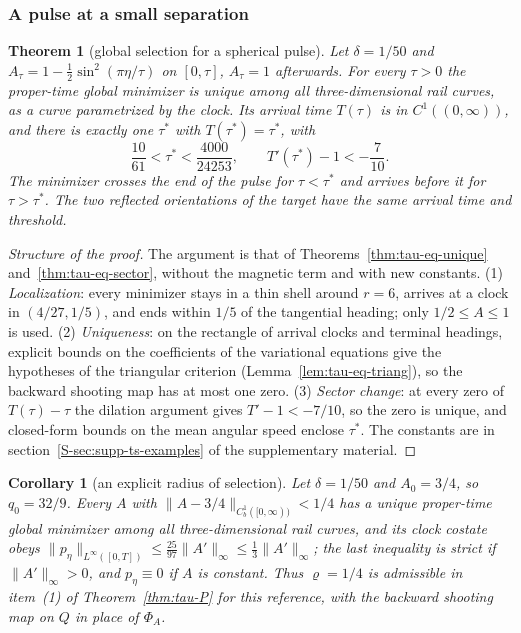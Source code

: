 \documentclass[aip,jmp,amsmath,amssymb,reprint]{revtex4-2}
\theoremstyle{plain}
\newtheorem{theorem}{Theorem}
\newtheorem{corollary}[proposition]{Corollary}
\theoremstyle{definition}
\begin{document}
\subsubsection*{A pulse at a small separation}
\begin{theorem}[global selection for a spherical pulse]\label{thm:tau-var-pulse}
Let $\delta=1/50$ and $A_\tau=1-\frac12\sin^2(\pi\eta/\tau)$ on $[0,\tau]$, $A_\tau=1$ afterwards. For every
$\tau>0$ the proper-time global minimizer is unique among all three-dimensional rail curves, as a curve
parametrized by the clock. Its arrival time $T(\tau)$ is in $C^1((0,\infty))$, and there is exactly one
$\tau^*$ with $T(\tau^*)=\tau^*$, with
\[
  \frac{10}{61}<\tau^*<\frac{4000}{24253},\qquad T'(\tau^*)-1<-\frac7{10}.
\]
The minimizer crosses the end of the pulse for $\tau<\tau^*$ and arrives before it for $\tau>\tau^*$. The two
reflected orientations of the target have the same arrival time and threshold.
\end{theorem}

\begin{proof}[Structure of the proof]
The argument is that of Theorems~\ref{thm:tau-eq-unique} and~\ref{thm:tau-eq-sector}, without the magnetic term and
with new constants. (1) \emph{Localization}: every minimizer stays in a thin shell around $r=6$, arrives at a clock
in $(4/27,1/5)$, and ends within $1/5$ of the tangential heading; only $1/2\le A\le1$ is used. (2)
\emph{Uniqueness}: on the rectangle of arrival clocks and terminal headings, explicit bounds on the coefficients
of the variational equations give the hypotheses of the triangular criterion (Lemma~\ref{lem:tau-eq-triang}), so
the backward shooting map has at most one zero. (3) \emph{Sector change}: at every zero of $T(\tau)-\tau$ the
dilation argument gives $T'-1<-7/10$, so the zero is unique, and closed-form bounds on the mean angular speed
enclose $\tau^*$. The constants are in section~\ref{S-sec:supp-ts-examples} of the supplementary material.
\end{proof}

\begin{corollary}[an explicit radius of selection]\label{cor:tau-var-rho}
Let $\delta=1/50$ and $A_0=3/4$, so $q_0=32/9$. Every $A$ with $\|A-3/4\|_{C^1_b([0,\infty))}<1/4$ has a unique
proper-time global minimizer among all three-dimensional rail curves, and its clock costate obeys
$\|p_\eta\|_{L^\infty([0,T])}\le\frac{25}{97}\|A'\|_\infty\le\frac13\|A'\|_\infty$; the last inequality is strict if
$\|A'\|_\infty>0$, and $p_\eta\equiv0$ if $A$ is constant. Thus $\varrho=1/4$ is admissible in item~(1) of Theorem~\ref{thm:tau-P} for this reference, with the backward
shooting map on $Q$ in place of $\Phi_A$.
\end{corollary}
\end{document}
